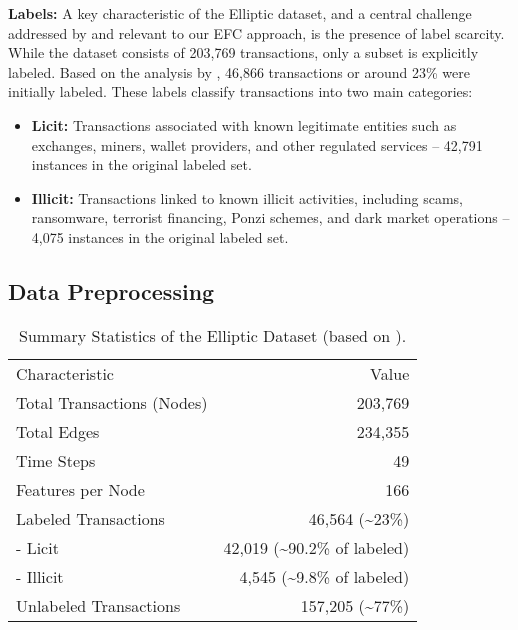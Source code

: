 \documentclass[12pt]{article}
\begin{document}
\textbf{Labels:} A key characteristic of the Elliptic dataset, and a central challenge addressed by 
\cite{lorenz2021machinelearningmethodsdetect} and relevant to our EFC approach, is the presence of label scarcity. While
the dataset consists of 203,769 transactions, only a subset is explicitly labeled. Based on the analysis by 
\cite{weber2019antimoneylaunderingbitcoinexperimenting}, 46,866 transactions or around 23\% were initially labeled.
These labels classify transactions into two main categories:

\begin{itemize}
    \item \textbf{Licit:} Transactions associated with known legitimate entities such as exchanges, miners, wallet providers,
      and other regulated services -- 42,791 instances in the original labeled set.
    \item \textbf{Illicit:} Transactions linked to known illicit activities, including scams, ransomware, terrorist financing,
      Ponzi schemes, and dark market operations -- 4,075 instances in the original labeled set.
\end{itemize}

\subsection{Data Preprocessing} \label{subsec:preprocessing}

\begin{table}[htbp]
  \centering
  \caption{Summary Statistics of the Elliptic Dataset (based on \cite{weber2019antimoneylaunderingbitcoinexperimenting}).}
  \label{tab:dataset_summary}
  \begin{tabular}{lr}
    \hline
    Characteristic        & Value \\
    Total Transactions (Nodes) & 203,769 \\
    Total Edges           & 234,355 \\
    Time Steps            & 49 \\
    Features per Node     & 166 \\
    Labeled Transactions  & 46,564 (\textasciitilde23\%) \\
    \quad - Licit         & 42,019 (\textasciitilde90.2\% of labeled) \\
    \quad - Illicit       & 4,545 (\textasciitilde9.8\% of labeled) \\
    Unlabeled Transactions & 157,205 (\textasciitilde77\%) \\
  \end{tabular}
\end{table}
\end{document}
